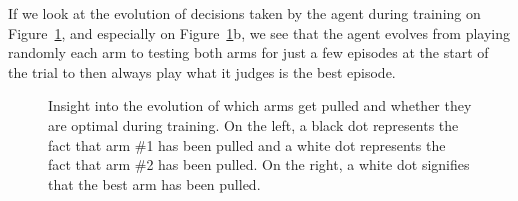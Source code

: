 If we look at the evolution of decisions taken by the agent during training
on Figure~\ref{fig:bandit_optimality}, and especially on
Figure~\ref{fig:bandit_optimality}b, we see that the agent evolves from playing
randomly each arm to testing both arms for just a few episodes at the start
of the trial to then always play what it judges is the best episode.

\begin{figure}
	\centering
	\caption{Insight into the evolution of which arms get pulled and 
	whether they are optimal during training. On the left, a black dot
	represents the fact that arm \#1 has been pulled and a white dot
	represents the fact that arm \#2 has been pulled. On the right, a white
	dot signifies that the best arm has been pulled.}
	\label{fig:bandit_optimality}
\end{figure}

